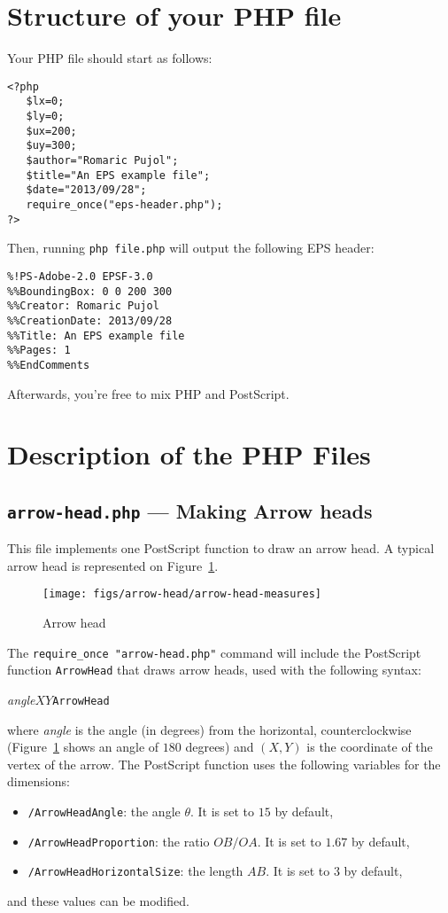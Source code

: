 \documentclass[10pt,a4paper]{scrartcl}
\newcommand\code[1]{\lstinline{#1}}
\newcommand\PS{PostScript}
\begin{document}
\section{Structure of your PHP file}
Your PHP file should start as follows:
\lstset{language=PHP}
\begin{lstlisting}
<?php
   $lx=0;
   $ly=0;
   $ux=200;
   $uy=300;
   $author="Romaric Pujol";
   $title="An EPS example file";
   $date="2013/09/28";
   require_once("eps-header.php");
?>
\end{lstlisting}

Then, running \code{php file.php} will output the following EPS header:
\begin{lstlisting}
%!PS-Adobe-2.0 EPSF-3.0
%%BoundingBox: 0 0 200 300
%%Creator: Romaric Pujol
%%CreationDate: 2013/09/28
%%Title: An EPS example file
%%Pages: 1
%%EndComments
\end{lstlisting}

Afterwards, you're free to mix PHP and \PS.

\section{Description of the PHP Files}
\subsection{\texttt{arrow-head.php} --- Making Arrow heads}
\label{ssec:arrow-head.php}
This file implements one \PS{} function to draw an arrow head.
A typical arrow head is represented on Figure~\ref{fig:arrow-head-explained}.
\begin{figure}[ht!]%
\centering
\texttt{[image: figs/arrow-head/arrow-head-measures]}%
\caption{Arrow head}%
\label{fig:arrow-head-explained}
\end{figure}

The \code{require_once "arrow-head.php"} command will include the \PS{} function
\texttt{ArrowHead} that draws arrow heads, used with the following syntax:
\begin{center}
\textit{angle}\quad$X$\quad$Y$\quad\texttt{ArrowHead}
\end{center}
where \textit{angle} is the angle (in degrees) from the horizontal,
counterclockwise (Figure~\ref{fig:arrow-head-explained} shows an angle of $180$
degrees) and $(X,Y)$ is the coordinate of the vertex of the arrow.
The \PS{} function uses the following variables for the dimensions:
\begin{itemize}
\item \texttt{/ArrowHeadAngle}: the angle $\theta$. It is set to $15$ by default,
\item \texttt{/ArrowHeadProportion}: the ratio $OB/OA$. It is set to $1.67$ by default,
\item \texttt{/ArrowHeadHorizontalSize}: the length $AB$. It is set to $3$ by default,
\end{itemize}
and these values can be modified.
\end{document}
